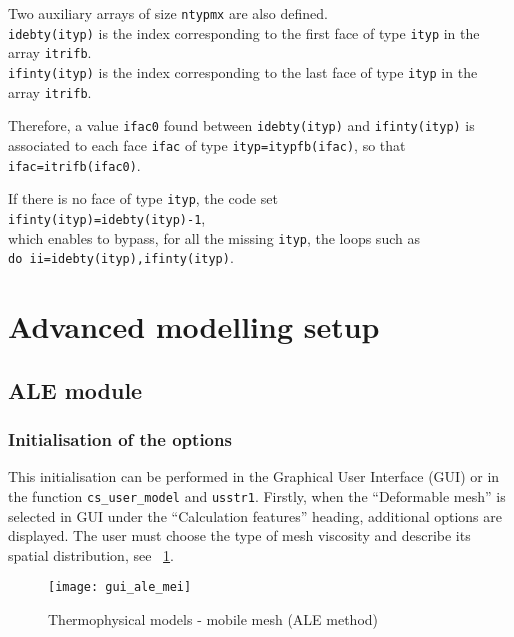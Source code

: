 Two auxiliary arrays of size \texttt{ntypmx} are also defined.\\
\texttt{idebty(ityp)} is the index
corresponding to the first
face of type \texttt{ityp} in the array \texttt{itrifb}.\\
\texttt{ifinty(ityp)} is the index
corresponding to the last
face of type \texttt{ityp} in the array \texttt{itrifb}.

Therefore, a value \texttt{ifac0} found between \texttt{idebty(ityp)} and
\texttt{ifinty(ityp)} is associated to each face \texttt{ifac} of type
\texttt{ityp=itypfb(ifac)}, so that \texttt{ifac=itrifb(ifac0)}.

If there is no face of type \texttt{ityp}, the code set \\
\texttt{ifinty(ityp)=idebty(ityp)-1},\\
which enables to bypass, for all the missing \texttt{ityp}, the loops such as \\
\texttt{do ii=idebty(ityp),ifinty(ityp)}.


\section{Advanced modelling setup}

\subsection{ALE module}
\subsubsection{Initialisation of the options}
This initialisation can be performed in the Graphical User Interface (GUI)
 or in the function \texttt{cs\_user\_model} and \texttt{usstr1}. Firstly,
 when the ``Deformable mesh'' is selected in GUI under the ``Calculation features''
 heading, additional options are displayed. The user must choose the type of mesh
 viscosity and describe its spatial distribution, see \figurename~\ref{fig:Ini-ale}.

\begin{figure}[!ht]
\begin{center}
\texttt{[image: gui\_ale\_mei]}
\caption{Thermophysical models - mobile mesh (ALE method)}
\label{fig:Ini-ale}
\end{center}
\end{figure}

